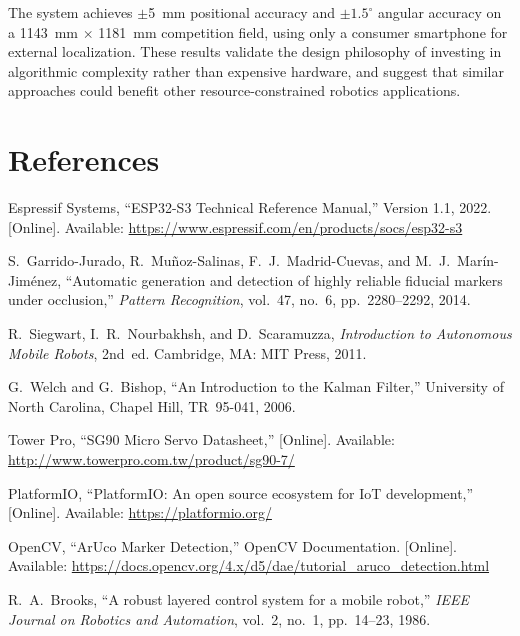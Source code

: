 \documentclass[12pt, a4paper, twoside]{article}
\begin{document}
The system achieves $\pm$\SI{5}{\milli\metre} positional accuracy and $\pm 1.5^\circ$ angular accuracy on a \SI{1143}{\milli\metre} $\times$ \SI{1181}{\milli\metre} competition field, using only a consumer smartphone for external localization. These results validate the design philosophy of investing in algorithmic complexity rather than expensive hardware, and suggest that similar approaches could benefit other resource-constrained robotics applications.

\newpage
\section*{References}

\begin{enumerate}[label={[\arabic*]}]
    \item Espressif Systems, ``ESP32-S3 Technical Reference Manual,'' Version 1.1, 2022. [Online]. Available: \url{https://www.espressif.com/en/products/socs/esp32-s3}

    \item S.~Garrido-Jurado, R.~Mu\~noz-Salinas, F.~J.~Madrid-Cuevas, and M.~J.~Mar\'in-Jim\'enez, ``Automatic generation and detection of highly reliable fiducial markers under occlusion,'' \textit{Pattern Recognition}, vol.~47, no.~6, pp.~2280--2292, 2014.

    \item R.~Siegwart, I.~R.~Nourbakhsh, and D.~Scaramuzza, \textit{Introduction to Autonomous Mobile Robots}, 2nd~ed. Cambridge, MA: MIT Press, 2011.

    \item G.~Welch and G.~Bishop, ``An Introduction to the Kalman Filter,'' University of North Carolina, Chapel Hill, TR~95-041, 2006.

    \item Tower Pro, ``SG90 Micro Servo Datasheet,'' [Online]. Available: \url{http://www.towerpro.com.tw/product/sg90-7/}

    \item PlatformIO, ``PlatformIO: An open source ecosystem for IoT development,'' [Online]. Available: \url{https://platformio.org/}

    \item OpenCV, ``ArUco Marker Detection,'' OpenCV Documentation. [Online]. Available: \url{https://docs.opencv.org/4.x/d5/dae/tutorial_aruco_detection.html}

    \item R.~A.~Brooks, ``A robust layered control system for a mobile robot,'' \textit{IEEE Journal on Robotics and Automation}, vol.~2, no.~1, pp.~14--23, 1986.
\end{enumerate}
\end{document}
